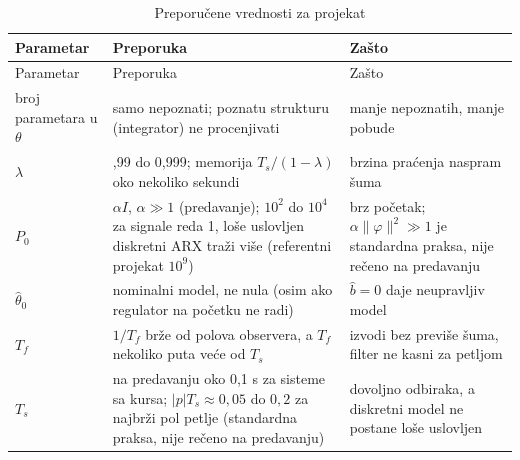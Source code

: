 \documentclass[11pt,a4paper,parskip=half,headsepline,numbers=noenddot]{scrartcl}
\begin{document}
\begin{longtable}[]{@{}
  >{\raggedright\arraybackslash}p{}
  >{\raggedright\arraybackslash}p{}
  >{\raggedright\arraybackslash}p{}@{}}
\caption{Preporučene vrednosti za projekat}\tabularnewline
\toprule\noalign{}
\begin{minipage}[b]{\linewidth}\raggedright
Parametar
\end{minipage} & \begin{minipage}[b]{\linewidth}\raggedright
Preporuka
\end{minipage} & \begin{minipage}[b]{\linewidth}\raggedright
Zašto
\end{minipage} \\
\midrule\noalign{}
\endfirsthead
\toprule\noalign{}
\begin{minipage}[b]{\linewidth}\raggedright
Parametar
\end{minipage} & \begin{minipage}[b]{\linewidth}\raggedright
Preporuka
\end{minipage} & \begin{minipage}[b]{\linewidth}\raggedright
Zašto
\end{minipage} \\
\midrule\noalign{}
\endhead
\bottomrule\noalign{}
\endlastfoot
broj parametara u \(\theta\) & samo nepoznati; poznatu strukturu (integrator) ne procenjivati & manje nepoznatih, manje pobude \\
\(\lambda\) & 0,99 do 0,999; memorija \(T_s/(1-\lambda)\) oko nekoliko sekundi & brzina praćenja naspram šuma \\
\(P_0\) & \(\alpha I\), \(\alpha \gg 1\) (predavanje); \(10^2\) do \(10^4\) za signale reda 1, loše uslovljen diskretni ARX traži više (referentni projekat \(10^9\)) & brz početak; \(\alpha\lVert\varphi\rVert^2 \gg 1\) je standardna praksa, nije rečeno na predavanju \\
\(\hat\theta_0\) & nominalni model, ne nula (osim ako regulator na početku ne radi) & \(\hat b = 0\) daje neupravljiv model \\
\(T_f\) & \(1/T_f\) brže od polova observera, a \(T_f\) nekoliko puta veće od \(T_s\) & izvodi bez previše šuma, filter ne kasni za petljom \\
\(T_s\) & na predavanju oko 0,1 s za sisteme sa kursa; \(\lvert p\rvert T_s \approx 0{,}05\) do \(0{,}2\) za najbrži pol petlje (standardna praksa, nije rečeno na predavanju) & dovoljno odbiraka, a diskretni model ne postane loše uslovljen \\

\end{longtable}
\end{document}
